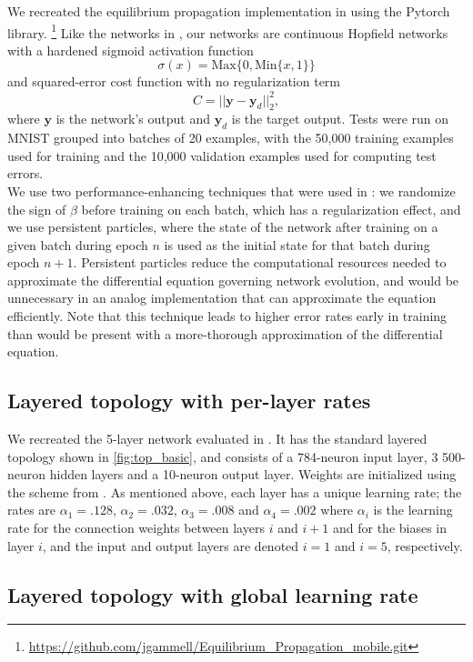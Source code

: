 \documentclass[format=sigconf]{acmart}
\newcommand{\mtx}[1]{\bm{#1}}
\newcommand{\npar}{\\\indent}
\begin{document}
We recreated the equilibrium propagation implementation in \cite{scellier17} using the Pytorch library.
\footnote{\url{https://github.com/jgammell/Equilibrium_Propagation_mobile.git}}
 Like the networks in \cite{scellier17}, our networks are continuous Hopfield networks with a hardened sigmoid activation function $$\sigma(x)=\text{Max}\{0, \text{Min}\{x, 1\}\}$$ and squared-error cost function with no regularization term $$C=||\mtx{y}-\mtx{y}_d||_2^2,$$ where $\mtx{y}$ is the network's output and $\mtx{y}_d$ is the target output. Tests were run on MNIST \cite{mnist1998} grouped into batches of 20 examples, with the 50,000 training examples used for training and the 10,000 validation examples used for computing test errors.
\npar
We use two performance-enhancing techniques that were used in \cite{scellier17}: we randomize the sign of $\beta$ before training on each batch, which has a regularization effect, and we use persistent particles, where the state of the network after training on a given batch during epoch $n$ is used as the initial state for that batch during epoch $n+1$. Persistent particles reduce the computational resources needed to approximate the differential equation governing network evolution, and would be unnecessary in an analog implementation that can approximate the equation efficiently. Note that this technique leads to higher error rates early in training than would be present with a more-thorough approximation of the differential equation.

\subsection{Layered topology with per-layer rates}
\label{sec:basic_topology}

We recreated the 5-layer network evaluated in \cite{scellier17}. It has the standard layered topology shown in \ref{fig:top_basic}, and consists of a 784-neuron input layer, 3 500-neuron hidden layers and a 10-neuron output layer. Weights are initialized using the scheme from \cite{glorot2010}. As mentioned above, each layer has a unique learning rate; the rates are $\alpha_1=.128$, $\alpha_2=.032$, $\alpha_3=.008$ and $\alpha_4=.002$ where $\alpha_i$ is the learning rate for the connection weights between layers $i$ and $i+1$ and for the biases in layer $i$, and the input and output layers are denoted $i=1$ and $i=5$, respectively.

\subsection{Layered topology with global learning rate}
\label{sec:basic_topology_uniform}
\end{document}
